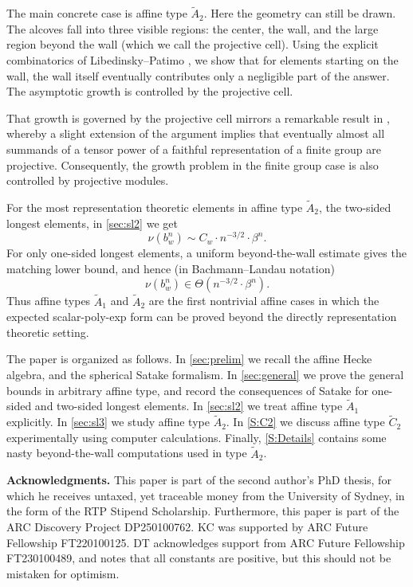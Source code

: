 \documentclass[a4paper,11pt]{amsart}
\numberwithin{equation}{subsection}
\theoremstyle{definition}
\theoremstyle{remark}
\begin{document}
The main concrete case is affine type \(\widetilde A_2\). Here the geometry
can still be drawn. The alcoves fall into three visible regions: the center,
the wall, and the large region beyond the wall (which we call the projective cell). Using the explicit
combinatorics of Libedinsky--Patimo \cite{LiPa}, we show that for elements
starting on the wall, the wall itself eventually contributes only a
negligible part of the answer. The asymptotic growth is controlled by the
projective cell.

\begin{Remark}
That growth is governed by the projective cell mirrors a remarkable result in \cite{BrKo-tensor-group}, whereby a slight extension of the argument implies that eventually almost all summands of a tensor power of a faithful representation of a finite group are projective. Consequently, the growth problem in the finite group case is also controlled by projective modules.
\end{Remark}

For the most representation theoretic elements in affine type
\(\widetilde A_2\), the two-sided longest elements, in \autoref{sec:sl2} we get
\[
\nu(b_w^n)\sim C_w\cdot n^{-3/2}\cdot \beta^n.
\]
For only one-sided longest elements, a uniform beyond-the-wall estimate gives the
matching lower bound, and hence (in Bachmann--Landau notation)
\[
\nu(b_w^n)\in \Theta(n^{-3/2}\cdot \beta^n).
\]
Thus affine types \(\widetilde A_1\) and \(\widetilde A_2\) are the first nontrivial affine cases in
which the expected scalar-poly-exp form can be proved beyond the directly
representation theoretic setting.

The paper is organized as follows. In \autoref{sec:prelim} we recall
the affine Hecke algebra, and the spherical Satake formalism. In \autoref{sec:general} we prove the
general bounds in arbitrary affine type, and record the consequences of
Satake for one-sided and two-sided longest elements. In \autoref{sec:sl2}
we treat affine type \(\widetilde A_1\) explicitly. In \autoref{sec:sl3}
we study affine type \(\widetilde A_2\). In \autoref{S:C2} we discuss affine type \(\widetilde C_2\) experimentally using computer calculations. Finally,
\autoref{S:Details} contains some nasty beyond-the-wall computations used in type
\(\widetilde A_2\).
\medskip

\noindent\textbf{Acknowledgments.}
This paper is part of the second author’s PhD thesis, for which he receives untaxed, yet traceable money from the University of Sydney, in the form of the RTP Stipend Scholarship. Furthermore, this paper is part of the ARC Discovery Project DP250100762. KC was supported by ARC Future Fellowship FT220100125. DT acknowledges support from ARC Future Fellowship FT230100489, and notes that all constants are positive, but this should not be mistaken for optimism.
\end{document}
